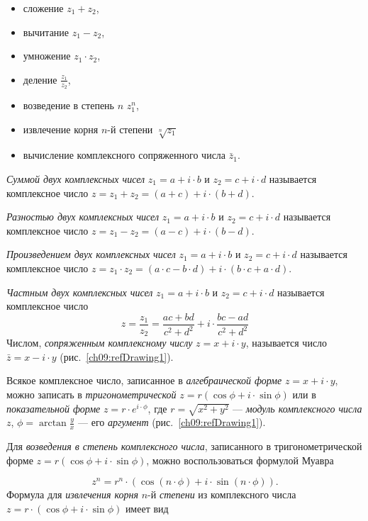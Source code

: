 \begin{itemize}
\item сложение  $z_1+z_2$,
\item вычитание  $z_1-z_2$,
\item умножение  $z_1\cdot z_2$,
\item деление  $\frac{z_1}{z_2}$,
\item возведение в степень $n$  $z_1^n$,
\item извлечение корня $n$-й степени  $\sqrt[n]{z_1}$ 
\item вычисление комплексного сопряженного числа  $\bar{z}_1$.
\end{itemize}
\emph{Суммой двух комплексных чисел}  $z_1=a+i\cdot b$ и  $z_2=c+i\cdot d$ называется комплексное число $z=z_1+z_2=(a+c)+i\cdot (b+d)$.

\emph{Разностью двух комплексных чисел}  $z_1=a+i\cdot b$  и  $z_2=c+i\cdot d$ называется комплексное число  $z=z_1-z_2=(a-c)+i\cdot (b-d)$.

\emph{Произведением двух комплексных чисел}  $z_1=a+i\cdot b$  и  $z_2=c+i\cdot d$  называется
комплексное число
 $z=z_1\cdot {z_2}=(a\cdot c-b\cdot d)+i\cdot (b\cdot c+a\cdot d)$.

\emph{Частным двух комплексных чисел}  $z_1=a+i\cdot b$  и  $z_2=c+i\cdot d$ называется комплексное
число
\begin{equation*}
z=\frac{z_1}{z_2}=\frac{ac+bd}{c^2+d^2}+i\cdot {\frac{bc-ad}{c^2+d^2}}
\end{equation*}
Числом, \emph{сопряженным комплексному числу} 
$z=x+i\cdot y$,  называется число  $\bar{z}=x-i\cdot y$ (рис.~\ref{ch09:refDrawing1}).

Всякое комплексное число, записанное в \emph{алгебраической форме}  $z=x+i\cdot y$,
можно записать в \emph{тригонометрической}  $z=r(\cos \phi+i\cdot \sin \phi)$ или в
\emph{показательной форме}  $z=r\cdot e^{i\cdot \phi}$, где  $r=\sqrt{x^2+y^2}$ ---
\emph{модуль комплексного числа}  $z$,  $\phi=\arctan \frac{y}{x}$ --- его \emph{аргумент}
(рис.~\ref{ch09:refDrawing1}).

Для \emph{возведения в степень комплексного числа}, записанного в тригонометрической форме  $z=r(\cos
\phi+i\cdot \sin \phi)$, можно воспользоваться формулой Муавра

\begin{equation*}
z^n=r^n\cdot (\cos (n\cdot \phi)+i\cdot \sin (n\cdot \phi)).
\end{equation*}
Формула для \emph{извлечения корня} $n$-й \emph{степени} из комплексного
числа  $z=r\cdot (\cos \phi+i\cdot \sin \phi)$ имеет вид

